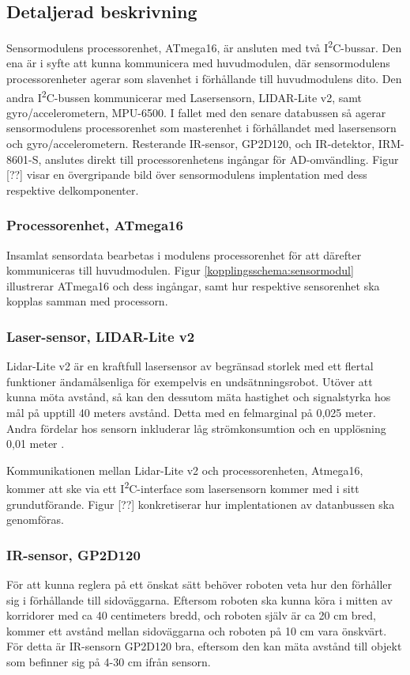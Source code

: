 \documentclass[11pt]{article}
\begin{document}
\begin{flushleft}
\begin{itemize}
\end{itemize}

\subsection{Detaljerad beskrivning}

Sensormodulens processorenhet, ATmega16, är ansluten med två I\textsuperscript{2}C-bussar. Den ena är i syfte att kunna kommunicera med huvudmodulen, där sensormodulens processorenheter agerar som slavenhet i förhållande till huvudmodulens dito. Den andra I\textsuperscript{2}C-bussen kommunicerar med Lasersensorn, LIDAR-Lite v2, samt gyro/accelerometern, MPU-6500. I fallet med den senare databussen så agerar sensormodulens processorenhet som masterenhet i förhållandet med lasersensorn och gyro/accelerometern.
Resterande IR-sensor, GP2D120, och IR-detektor, IRM-8601-S, anslutes direkt till processorenhetens ingångar för AD-omvändling. Figur [??] visar en övergripande bild över sensormodulens implentation med dess respektive delkomponenter. 

\subsubsection{Processorenhet, ATmega16}
Insamlat sensordata bearbetas i modulens processorenhet för att därefter kommuniceras till huvudmodulen. Figur \ref{kopplingsschema:sensormodul} illustrerar ATmega16 och dess ingångar, samt hur respektive sensorenhet ska kopplas samman med processorn. 

\subsubsection{Laser-sensor, LIDAR-Lite v2}
Lidar-Lite v2 är en kraftfull lasersensor av begränsad storlek med ett flertal funktioner ändamålsenliga för exempelvis en undsätnningsrobot. Utöver att kunna möta avstånd, så kan den dessutom mäta hastighet och signalstyrka hos mål på upptill 40 meters avstånd. Detta med en felmarginal på 0,025 meter. Andra fördelar hos sensorn inkluderar låg strömkonsumtion och en upplösning 0,01 meter \cite{7131685}.

Kommunikationen mellan Lidar-Lite v2 och processorenheten, Atmega16, kommer att ske via ett I\textsuperscript{2}C-interface som lasersensorn kommer med i sitt grundutförande. Figur [??] konkretiserar hur implentationen av datanbussen ska genomföras. 

\subsubsection{IR-sensor, GP2D120}
För att kunna reglera på ett önskat sätt behöver roboten veta hur den förhåller sig i förhållande till sidoväggarna. Eftersom roboten ska kunna köra i mitten av korridorer med ca 40 centimeters bredd, och roboten själv är ca 20 cm bred, kommer ett avstånd mellan sidoväggarna och roboten på 10 cm vara önskvärt. För detta är IR-sensorn GP2D120 bra, eftersom den kan mäta avstånd till objekt som befinner sig på 4-30 cm ifrån sensorn. 


\end{flushleft}
\end{document}
